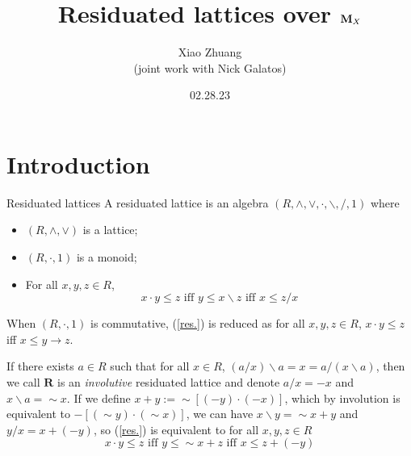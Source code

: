 \documentclass[professionalfont, 10pt]{beamer} %
\title[Residuated lattices over $\m M_X$]{Residuated lattices over $\m M_X$}
\author[Xiao Zhuang]{Xiao Zhuang\\
  \small{(joint work with Nick Galatos)} }
\institute[University of Denver]
{University of Denver}
\date{02.28.23}
\theoremstyle{plain}
\theoremstyle{definition}
\newcommand{\m}[1]{{\mathbf {#1} }}
\begin{document}


\begin{frame}[plain]{}
\hsize\textwidth
\columnwidth\textwidth
\maketitle

\end{frame}

\section{Introduction}

\begin{frame}{Residuated lattices}
    A residuated lattice is an algebra $(R, \wedge, \vee, \cdot, \backslash, /, 1)$ where
    \begin{itemize}
        \item $(R, \wedge, \vee)$ is a lattice;

        \item $(R, \cdot, 1)$ is a monoid;

        \item For all $x, y, z \in R$,
        \begin{equation}\tag{residuation}\label{res.}
            x \cdot y \leq z \text{ iff } y \leq x \backslash z \text{ iff } x \leq z/x
        \end{equation}
    \end{itemize}

\pause

{ When $(R, \cdot, 1)$ is commutative, (\ref{res.}) is reduced as for all $x, y, z \in R$, $x \cdot y \leq z$ iff $x \leq y \rightarrow z$. \pause

If there exists $a \in R$ such that for all $x \in R$, $(a/x) \backslash a = x = a/(x \backslash a)$, then we call $\m R$ is an \emph{involutive} residuated lattice and denote $a/x = -x$ and $x \backslash a = {\sim} x$.
If we define $x+y := {\sim}[(-y) \cdot (-x)]$, which by involution is equivalent to $-[({\sim}y) \cdot ({\sim}x)]$, we can have $x \backslash y = {\sim}x + y$ and $y/x = x + (-y)$, so (\ref{res.}) is equivalent to for all $x, y, z \in R$
$$x \cdot y \leq z \text{ iff } y \leq {\sim} x + z \text{ iff } x \leq z + (-y)$$}

\end{frame}
\end{document}
